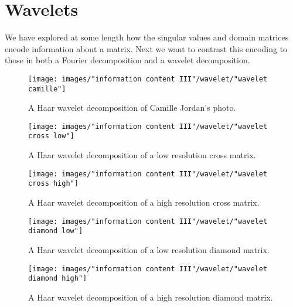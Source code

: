 \clearpage
\section{Wavelets}

We have explored at some length how the singular values and domain matrices encode information about a matrix. Next we want to contrast this encoding to those in both a Fourier decomposition and a wavelet decomposition.

%
%
%
\begin{figure}[htbp] %
   \centering
   \texttt{[image: images/"information content III"/wavelet/"wavelet camille"]} 
   \caption{A Haar wavelet decomposition of Camille Jordan's photo.}
   \label{fig:wavelets:camille}
\end{figure}

%


\begin{figure}[htbp] %
   \centering
   \texttt{[image: images/"information content III"/wavelet/"wavelet cross low"]} 
   \caption{A Haar wavelet decomposition of a low resolution cross matrix.}
   \label{fig:wavelets:cross low}
\end{figure}
%
\begin{figure}[htbp] %
   \centering
   \texttt{[image: images/"information content III"/wavelet/"wavelet cross high"]} 
   \caption{A Haar wavelet decomposition of a high resolution cross matrix.}
   \label{fig:wavelets:cross high}
\end{figure}

\begin{figure}[htbp] %
   \centering
   \texttt{[image: images/"information content III"/wavelet/"wavelet diamond low"]} 
   \caption{A Haar wavelet decomposition of a low resolution diamond matrix.}
   \label{fig:wavelets:diamond low}
\end{figure}
%
\begin{figure}[htbp] %
   \centering
   \texttt{[image: images/"information content III"/wavelet/"wavelet diamond high"]} 
   \caption{A Haar wavelet decomposition of a high resolution diamond matrix.}
   \label{fig:wavelets:diamond high}
\end{figure}

